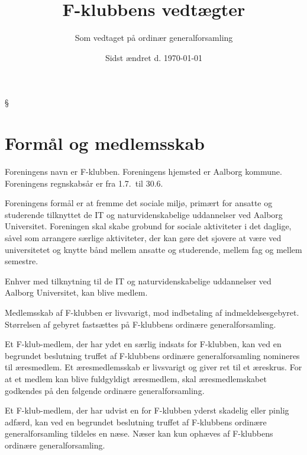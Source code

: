\documentclass[a4paper,12pt,danish]{article}
\title{\bf F-klubbens vedt{\ae}gter}
\author{Som vedtaget på ordin{\ae}r generalforsamling}
\date{Sidst ændret d. \today}
\begin{document}
\maketitle





\begin{list}
{\S {}}{}
\section{Form{\aa}l og medlemsskab}
\item Foreningens navn er F-klubben. Foreningens hjemsted er Aalborg
  kommune. Foreningens regnskabs{\aa}r er fra 1.7.\ til 30.6.
  
\item Foreningens form{\aa}l er at fremme det sociale milj{\o},
  prim{\ae}rt for ansatte og studerende tilknyttet de IT og
  naturvidenskabelige uddannelser ved Aalborg Universitet. Foreningen
  skal skabe grobund for sociale aktiviteter i det daglige, s{\aa}vel
  som arrangere s{\ae}rlige aktiviteter, der kan g{\o}re det sjovere at
  v{\ae}re ved universitetet og knytte b{\aa}nd mellem ansatte og
  studerende, mellem fag og mellem semestre.

\item Enhver med tilknytning til de IT og naturvidenskabelige uddannelser ved Aalborg Universitet, kan blive medlem.

\item Medlemsskab af F-klubben er livsvarigt, mod indbetaling af indmeldelsesgebyret.
  St{\o}rrelsen af gebyret fasts{\ae}ttes p{\aa} F-klubbens ordin{\ae}re generalforsamling.
  
\item Et F-klub-medlem, der har ydet en s{\ae}rlig indsats for
  F-klubben, kan ved en begrundet beslutning truffet af F-klubbens
  ordin{\ae}re generalforsamling nomineres til {\ae}resmedlem. Et
  {\ae}resmedlemsskab er livsvarigt og giver ret til et {\ae}reskrus. For
  at et medlem kan blive fuldgyldigt {\ae}resmedlem, skal {\ae}resmedlemskabet
	godkendes p{\aa} den f{\o}lgende ordin{\ae}re
  generalforsamling.
  
\item Et F-klub-medlem, der har udvist en for F-klubben yderst
  skadelig eller pinlig adf{\ae}rd, kan ved en begrundet beslutning
  truffet af F-klubbens ordin{\ae}re generalforsamling tildeles en
  n{\ae}se.  N{\ae}ser kan kun oph{\ae}ves af F-klubbens ordin{\ae}re
  generalforsamling.


\end{list}
\end{document}
